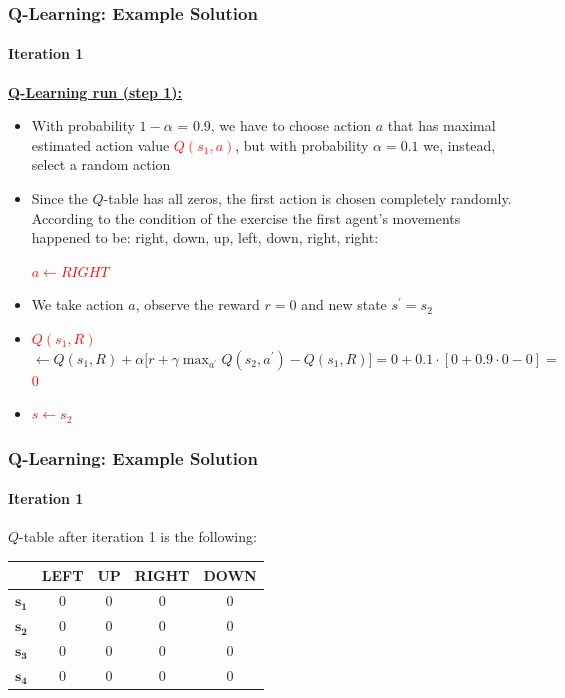 \begin{frame}[<+->]
	\frametitle{Q-Learning: Example Solution}
	\framesubtitle{Iteration 1}
	
	\vspace{0.5cm}
	
	\textbf{\underline{Q-Learning run (step 1):}}
	
	\begin{itemize}
		\item With probability $ 1 - \alpha $ = 0.9, we have to choose action $ a $ that
			  has maximal estimated action value \textcolor{red}{$ Q(s_1,a) $}, but with
			  probability $ \alpha = 0.1 $ we, instead, select a random action
		\item Since the $ Q $-table has all zeros, the first action is chosen completely
			  randomly. According to the condition of the exercise the first agent's
			  movements happened to be: right, down, up, left, down, right, right:
			  
			  \begin{center}
				  \textcolor{red}{$ a \leftarrow RIGHT $}
			  \end{center}
		\item We take action $ a $, observe the reward $ r = 0 $ and new state $
			  s^\prime = s_2 $
		\item \textcolor{red}{$ Q(s_1,R) $} $ \leftarrow Q(s_1,R) + \alpha \Big [ r + \gamma \max_{a^\prime} Q(s_2,a^\prime) - Q(s_1,R) \Big ] = 0 + 0.1 \cdot [ 0 + 0.9 \cdot 0 - 0 ] = $ \textcolor{red}{$ 0 $}
		\item \textcolor{red}{$ s \leftarrow s_2 $}
	\end{itemize}
\end{frame}

\begin{frame}
	\frametitle{Q-Learning: Example Solution}
	\framesubtitle{Iteration 1}
	
	\Large
	
	$ Q $-table after iteration 1 is the following:
	
	\begin{table}[!h]
		\begin{tabular}{c|c|c|c|c|}
			\cline{2-5}
			& \textbf{LEFT} & \textbf{UP} & \textbf{RIGHT} & \textbf{DOWN} \\ \hline
			\multicolumn{1}{|c|}{$ \mathbf{s_1} $} & $ 0 $ & $ 0 $ & $ 0 $ & $ 0 $\\ \hline
			\multicolumn{1}{|c|}{$ \mathbf{s_2} $} & $ 0 $ & $ 0 $ & $ 0 $ & $ 0 $\\ \hline
			\multicolumn{1}{|c|}{$ \mathbf{s_3} $} & $ 0 $ & $ 0 $ & $ 0 $ & $ 0 $\\ \hline
			\multicolumn{1}{|c|}{$ \mathbf{s_4} $} & $ 0 $ & $ 0 $ & $ 0 $ & $ 0 $\\ \hline
		\end{tabular}
	\end{table}
\end{frame}

